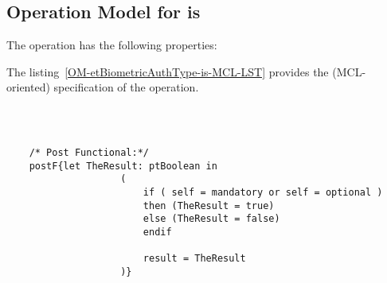 \subsection{Operation Model for is}

\label{OM-is}


The  operation has the following properties:

	\begin{operationmodel}



		


	\end{operationmodel}



	\vspace{1cm}
	The listing~\ref{OM-etBiometricAuthType-is-MCL-LST} provides the \msrmessir (MCL-oriented) specification of the operation.
	
	\scriptsize
	\vspace{0.5cm}
	\begin{lstlisting}[style=MessirStyle,firstnumber=auto,captionpos=b,caption={\msrmessir (MCL-oriented) specification of the operation \emph{is}.},label=OM-etBiometricAuthType-is-MCL-LST]

	
	
	/* Post Functional:*/ 
	postF{let TheResult: ptBoolean in
			        (
			        	if ( self = mandatory or self = optional )
			          	then (TheResult = true)
			          	else (TheResult = false)
			          	endif
			          	
			          	result = TheResult
			        )}
	
	
	\end{lstlisting}
	\normalsize 
	
	
	
	





